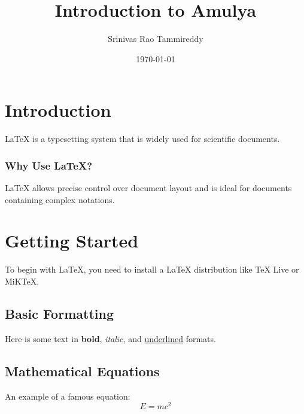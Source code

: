\documentclass[12pt]{report}  %
\title{\textbf{Introduction to Amulya}} %
\author{Srinivas Rao Tammireddy} %
\date{\today}                  %
\begin{document}

\maketitle                     %

\section{Introduction}         %
LaTeX is a typesetting system that is widely used for scientific documents.

\subsubsection{Why Use LaTeX?}    %
LaTeX allows precise control over document layout and is ideal for documents containing complex notations.

\section{Getting Started}      %
To begin with LaTeX, you need to install a LaTeX distribution like TeX Live or MiKTeX.

\subsection{Basic Formatting}
Here is some text in \textbf{bold}, \textit{italic}, and \underline{underlined} formats.

\subsection{Mathematical Equations}
An example of a famous equation:
\[E = mc^2\]
\end{document}

